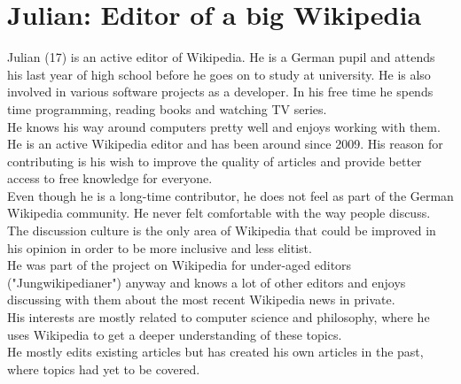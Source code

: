 \section{Julian: Editor of a big Wikipedia}
Julian (17) is an active editor of Wikipedia. He is a German pupil and attends his last year of high school before he goes on to study at university. He is also involved in various software projects as a developer. In his free time he spends time programming, reading books and watching TV series. \\
He knows his way around computers pretty well and enjoys working with them. \\
He is an active Wikipedia editor and has been around since 2009. His reason for contributing is his wish to improve the quality of articles and provide better access to free knowledge for everyone. \\
Even though he is a long-time contributor, he does not feel as part of the German Wikipedia community. He never felt comfortable with the way people discuss. The discussion culture is the only area of Wikipedia that could be improved in his opinion in order to be more inclusive and less elitist. \\
He was part of the project on Wikipedia for under-aged editors ("Jungwikipedianer") anyway and knows a lot of other editors and enjoys discussing with them about the most recent Wikipedia news in private. \\
His interests are mostly related to computer science and philosophy, where he uses Wikipedia to get a deeper understanding of these topics. \\
He mostly edits existing articles but has created his own articles in the past, where topics had yet to be covered.

